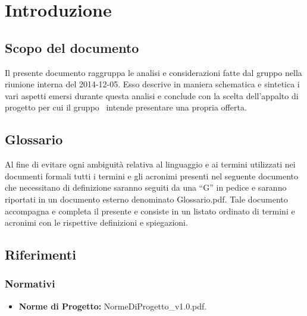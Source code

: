 \section{Introduzione}
\subsection{Scopo del documento}
Il presente documento raggruppa le analisi e considerazioni fatte dal gruppo nella
riunione interna del 2014-12-05. Esso descrive in maniera schematica e sintetica i
vari aspetti emersi durante questa analisi e conclude con la scelta dell'appalto di
progetto per cui il gruppo \gruppo\ intende presentare una propria offerta. 

\subsection{Glossario}

Al fine di evitare ogni ambiguità relativa al linguaggio e ai termini utilizzati nei documenti formali tutti i termini e gli acronimi presenti nel seguente documento che necessitano di definizione saranno seguiti da una ``G'' in pedice e saranno riportati in un documento esterno denominato Glossario.pdf. Tale documento accompagna e completa il presente e consiste in un listato ordinato di termini e acronimi con le rispettive definizioni e spiegazioni.

\subsection{Riferimenti}
\subsubsection{Normativi}
\begin{itemize}
	\item \textbf{Norme di Progetto:} NormeDiProgetto\_v1.0.pdf.
\end{itemize}
